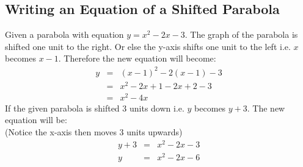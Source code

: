
\subsection{Writing an Equation of a Shifted Parabola}
Given a parabola with equation $y = x^2 - 2x - 3$.  The graph of the parabola is shifted one unit to the right.  Or else the y-axis shifts one unit to the left i.e. $x$ becomes $x-1$. Therefore the new equation will become:\\
\begin{eqnarray*}
y &=& (x-1)^2 - 2(x - 1) - 3\\
&=& x^2 - 2x + 1 - 2x + 2 - 3\\
&=& x^2 -4x
\end{eqnarray*}
If the given parabola is shifted $3$ units down i.e. $y$ becomes $y+3$. The new equation will be:\\
(Notice the x-axis then moves $3$ units upwards)
\begin{eqnarray*}
y + 3 &=& x^2 - 2x - 3\\
y&=&x^2 - 2x - 6
\end{eqnarray*}


